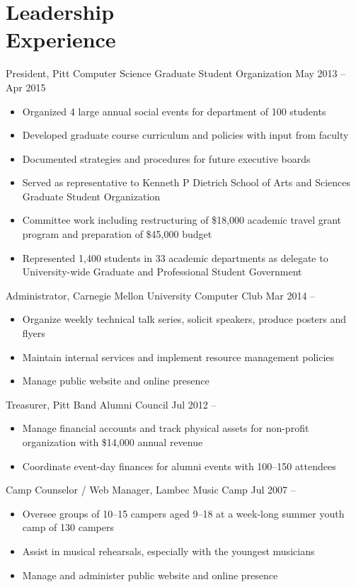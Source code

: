 \documentclass[11pt]{article}
\newcommand{\textdb}[1]{\fontseries{db}\selectfont#1\normalfont}
\newcommand{\present}{\phantom{Xxx 20XX}}
\begin{document}
\section{Leadership\\ Experience}

\textdb{
President, Pitt Computer Science Graduate Student Organization
	\hfill May 2013 -- Apr 2015
}
\begin{itemize}
	\item Organized 4 large annual social events for department of 100 students
	\item Developed graduate course curriculum and policies with input from faculty
	\item Documented strategies and procedures for future executive boards
	\item Served as representative to Kenneth P Dietrich School of Arts and Sciences
		Graduate Student Organization
	\item Committee work including restructuring of \$18,000 academic travel grant program
		and preparation of \$45,000 budget
	\item Represented 1,400 students in 33 academic departments as delegate to
		University-wide Graduate and Professional Student Government
\end{itemize}

\textdb{
Administrator, Carnegie Mellon University Computer Club
	\hfill Mar 2014 -- \present
}
\begin{itemize}
	\item Organize weekly technical talk series, solicit speakers, produce posters and flyers
	\item Maintain internal services and implement resource management policies
	\item Manage public website and online presence
\end{itemize}

\textdb{
Treasurer, Pitt Band Alumni Council
	\hfill Jul 2012 -- \present
}
\begin{itemize}
	\item Manage financial accounts and track physical assets
		for non-profit organization with \$14,000 annual revenue
	\item Coordinate event-day finances for alumni events with 100--150 attendees
\end{itemize}

\selectfont
Camp Counselor / Web Manager, Lambec Music Camp
	\hfill Jul 2007 -- \present
\normalfont
\begin{itemize}
	\item Oversee groups of 10--15 campers aged 9--18 at a week-long summer youth camp of 130 campers
	\item Assist in musical rehearsals, especially with the youngest musicians
	\item Manage and administer public website and online presence
\end{itemize}
\end{document}

